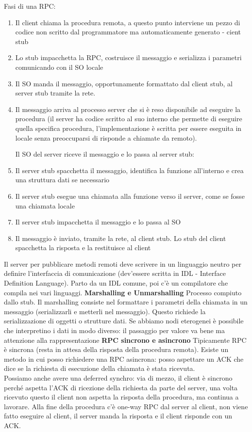 \documentclass[12pt,italian]{report}
\begin{document}
\noindent Fasi di una RPC:
\begin{enumerate}
    \item Il client chiama la procedura remota, a questo punto interviene un pezzo di codice non scritto dal programmatore ma automaticamente generato - cient stub
    \item Lo stub impacchetta la RPC, costruisce il messaggio e serializza i parametri comunicando con il SO locale
    \item Il SO manda il messaggio, opportunamente formattato dal client stub, al server stub tramite la rete. 
    \item Il messaggio arriva al processo server che si è reso disponibile ad eseguire la procedura (il server ha codice scritto al suo interno che permette di eseguire quella specifica procedura, l'implementazione è scritta per essere eseguita in locale senza preoccuparsi di risponde a chiamate da remoto).

\noindent Il SO del server riceve il messaggio e lo passa al server stub:

    \item Il server stub spacchetta il messaggio, identifica la funzione all'interno e crea una struttura dati se necessario
    \item Il server stub esegue una chiamata alla funzione verso il server, come se fosse una chiamata locale
    \item Il server stub impacchetta il messaggio e lo passa al SO
    \item Il messaggio è inviato, tramite la rete, al client stub. Lo stub del client spacchetta la risposta e la restituisce al client
\end{enumerate}
Il server per pubblicare metodi remoti deve scrivere in un linguaggio neutro per definire l'interfaccia di comunicazione (dev'essere scritta in IDL - Interface Definition Language). Parto da un IDL comune, poi c'è un compilatore che compila nei vari linguaggi.
\bigbreak
\noindent \textbf{Marshalling e Unmarshalling}
Processo compiuto dallo stub. Il marshalling consiste nel formattare i parametri della chiamata in un messaggio (serializzarli e metterli nel messaggio). Questo richiede la serializzazione di oggetti o strutture dati. Se abbiamo nodi eterogenei è possibile che interpretino i dati in modo diverso: il passaggio per valore va bene ma attenzione alla rappresentazione
\bigbreak
\noindent \textbf{RPC sincrono e asincrono}
Tipicamente RPC è sincrona (resta in attesa della risposta della procedura remota). Esiste un metodo in cui posso richiedere una RPC asincrona: posso aspettare un ACK che dice se la richiesta di esecuzione della chiamata è stata ricevuta. \\ Possiamo anche avere una deferred synchro: via di mezzo, il client è sincrono perché aspetta l'ACK di ricezione della richiesta da parte del server, una volta ricevuto questo il client non aspetta la risposta della procedura, ma continua a lavorare. Alla fine della procedura c'è one-way RPC dal server al client, non viene fatto eseguire al client, il server manda la risposta e il client risponde con un ACK.
\end{document}
